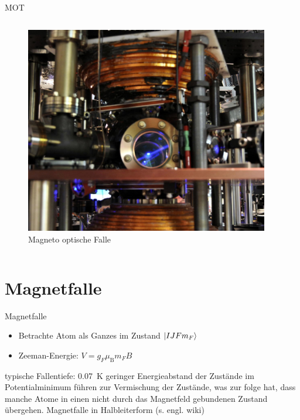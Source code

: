 \documentclass[12pt,xcolor=dvipsnames]{beamer}
\begin{document}
\begin{frame}{MOT}
\begin{columns}

	\begin{figure}
		\centering
		\includegraphics[width=0.95\textwidth]{./figures/mot_columbia.jpg}
		\caption{Magneto optische Falle \cite{columbia}}
	\end{figure}
\end{columns}
\end{frame}


\section{Magnetfalle}

\begin{frame}{Magnetfalle}

\begin{itemize}
	\item Betrachte Atom als Ganzes im Zustand $\ket{I J F m_F}$
	\item Zeeman-Energie: $V = g_F \mu_\mathrm{B} m_F B$
\end{itemize}

typische Fallentiefe: \SI{0.07}{\kelvin}
geringer Energieabstand der Zustände im Potentialminimum führen zur Vermischung der Zustände, was zur folge hat, dass manche Atome in einen nicht durch das Magnetfeld gebundenen Zustand übergehen.
Magnetfalle in Halbleiterform (s. engl. wiki)
\end{frame}
\end{document}
